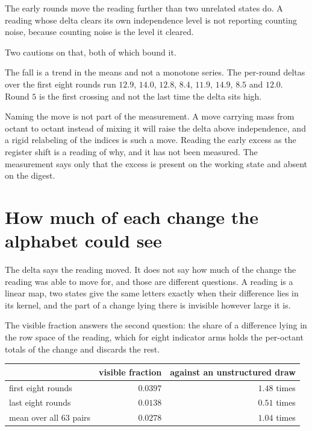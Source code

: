 The early rounds move the reading further than two unrelated states do. A reading whose delta clears its own independence level is not reporting counting noise, because counting noise is the level it cleared.

Two cautions on that, both of which bound it.

The fall is a trend in the means and not a monotone series. The per-round deltas over the first eight rounds run \(12.9\), \(14.0\), \(12.8\), \(8.4\), \(11.9\), \(14.9\), \(8.5\) and \(12.0\). Round \(5\) is the first crossing and not the last time the delta sits high.

Naming the move is not part of the measurement. A move carrying mass from octant to octant instead of mixing it will raise the delta above independence, and a rigid relabeling of the indices is such a move. Reading the early excess as the register shift is a reading of why, and it has not been measured. The measurement says only that the excess is present on the working state and absent on the digest.

\section{How much of each change the alphabet could see}

The delta says the reading moved. It does not say how much of the change the reading was able to move for, and those are different questions. A reading is a linear map, two states give the same letters exactly when their difference lies in its kernel, and the part of a change lying there is invisible however large it is.

The visible fraction answers the second question: the share of a difference lying in the row space of the reading, which for eight indicator arms holds the per-octant totals of the change and discards the rest.

\begin{center}
\begin{tabular}{@{}lrr@{}}
\toprule
 & visible fraction & against an unstructured draw \\
\midrule
first eight rounds & \(0.0397\) & \(1.48\) times \\
last eight rounds & \(0.0138\) & \(0.51\) times \\
mean over all 63 pairs & \(0.0278\) & \(1.04\) times \\
\bottomrule
\end{tabular}
\end{center}

